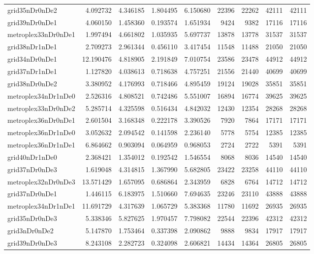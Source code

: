 \begin{longtable}{|l|r|r|r|r|r|r|r|r|}
grid35nDr0nDe2 & 4.092732 & 4.346185 & 1.804495 & 6.150680 & 22396 & 22262 & 42111 & 42111 \\
grid39nDr0nDe1 & 4.060150 & 1.458360 & 0.193574 & 1.651934 & 9424 & 9382 & 17116 & 17116 \\
metroplex33nDr0nDe1 & 1.997494 & 4.661802 & 1.035935 & 5.697737 & 13878 & 13778 & 31537 & 31537 \\
grid38nDr1nDe1 & 2.709273 & 2.961344 & 0.456110 & 3.417454 & 11548 & 11488 & 21050 & 21050 \\
grid34nDr0nDe1 & 12.190476 & 4.818905 & 2.191849 & 7.010754 & 23586 & 23478 & 44912 & 44912 \\
grid37nDr1nDe1 & 1.127820 & 4.038613 & 0.718638 & 4.757251 & 21556 & 21440 & 40699 & 40699 \\
grid38nDr0nDe2 & 3.380952 & 4.176993 & 0.718466 & 4.895459 & 19124 & 19028 & 35851 & 35851 \\
metroplex34nDr1nDe0 & 2.526316 & 4.808521 & 0.742486 & 5.551007 & 16894 & 16774 & 39625 & 39625 \\
metroplex33nDr0nDe2 & 5.285714 & 4.325598 & 0.516434 & 4.842032 & 12430 & 12354 & 28268 & 28268 \\
metroplex36nDr0nDe1 & 2.601504 & 3.168348 & 0.222178 & 3.390526 & 7920 & 7864 & 17171 & 17171 \\
metroplex36nDr1nDe0 & 3.052632 & 2.094542 & 0.141598 & 2.236140 & 5778 & 5754 & 12385 & 12385 \\
metroplex36nDr1nDe1 & 6.864662 & 0.903094 & 0.064959 & 0.968053 & 2724 & 2722 & 5391 & 5391 \\
grid40nDr1nDe0 & 2.368421 & 1.354012 & 0.192542 & 1.546554 & 8068 & 8036 & 14540 & 14540 \\
grid37nDr0nDe3 & 1.619048 & 4.314815 & 1.367990 & 5.682805 & 23422 & 23258 & 44110 & 44110 \\
metroplex32nDr0nDe3 & 13.571429 & 1.657095 & 0.686864 & 2.343959 & 6828 & 6764 & 14712 & 14712 \\
grid37nDr0nDe1 & 1.446115 & 6.183975 & 1.510660 & 7.694635 & 23246 & 23110 & 43888 & 43888 \\
metroplex34nDr1nDe1 & 11.691729 & 4.317639 & 1.065729 & 5.383368 & 11780 & 11692 & 26935 & 26935 \\
grid35nDr0nDe3 & 5.338346 & 5.827625 & 1.970457 & 7.798082 & 22544 & 22396 & 42312 & 42312 \\
grid3nDr0nDe2 & 5.147870 & 1.753464 & 0.337398 & 2.090862 & 9888 & 9834 & 17917 & 17917 \\
grid39nDr0nDe3 & 8.243108 & 2.282723 & 0.324098 & 2.606821 & 14434 & 14364 & 26805 & 26805 \\

\end{longtable}
